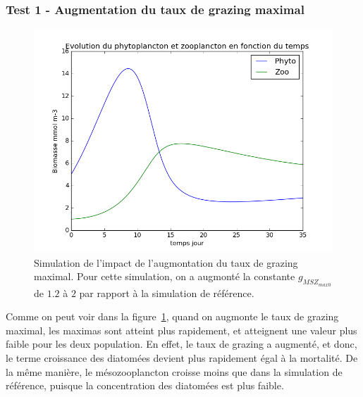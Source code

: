 {\subsubsection{Test 1 - Augmentation du taux de grazing maximal}
\begin{figure}[h!]
  \includegraphics[width=\textwidth]{partie1/test1x35.png}
  \caption{Simulation de l'impact de l'augmontation du taux de grazing maximal. Pour cette simulation,
on a augmonté la constante $g_{MSZ_{max0}}$ de $1.2$ à $2$ par rapport à la simulation de référence.}
  \label{fig:partie1t1}
\end{figure}
\par{
Comme on peut voir dans la figure~\ref{fig:partie1t1}, quand on augmonte le taux de grazing maximal, 
les maximas sont atteint plus rapidement, et atteignent une valeur plus faible pour les deux population.
En effet, le taux de grazing a augmenté, et donc, le terme croissance des diatomées devient plus rapidement
égal à la mortalité. De la même manière, le mésozooplancton croisse moins que dans la simulation de référence,
puisque la concentration des diatomées est plus faible.
}
}
